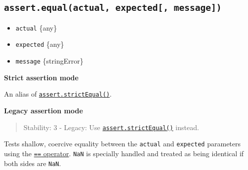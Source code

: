 \subsection{\texorpdfstring{\texttt{assert.equal(actual,\ expected{[},\ message{]})}}{assert.equal(actual, expected{[}, message{]})}}\label{assert.equalactual-expected-message}

\begin{itemize}
\tightlist
\item
  \texttt{actual} \{any\}
\item
  \texttt{expected} \{any\}
\item
  \texttt{message} \{string\textbar Error\}
\end{itemize}

\textbf{Strict assertion mode}

An alias of
\hyperref[assertstrictequalactual-expected-message]{\texttt{assert.strictEqual()}}.

\textbf{Legacy assertion mode}

\begin{quote}
Stability: 3 - Legacy: Use
\hyperref[assertstrictequalactual-expected-message]{\texttt{assert.strictEqual()}}
instead.
\end{quote}

Tests shallow, coercive equality between the \texttt{actual} and
\texttt{expected} parameters using the
\href{https://developer.mozilla.org/en-US/docs/Web/JavaScript/Reference/Operators/Equality}{\texttt{==}
operator}. \texttt{NaN} is specially handled and treated as being
identical if both sides are \texttt{NaN}.

\begin{Shaded}
\begin{Highlighting}[]
 \OperatorTok{;}

\NormalTok{(}\OperatorTok{,} \NormalTok{)}\OperatorTok{;}
\NormalTok{(}\OperatorTok{,} \StringTok{\textquotesingle{}1\textquotesingle{}}\NormalTok{)}\OperatorTok{;}
\NormalTok{(}\OperatorTok{,} \NormalTok{)}\OperatorTok{;}

\NormalTok{(}\OperatorTok{,} \NormalTok{)}\OperatorTok{;}
\NormalTok{(\{ }\OperatorTok{:}\NormalTok{ \{ }\OperatorTok{:} \NormalTok{ \} \}}\OperatorTok{,}\NormalTok{ \{ }\OperatorTok{:}\NormalTok{ \{ }\OperatorTok{:} \NormalTok{ \} \})}\OperatorTok{;}
\end{Highlighting}
\end{Shaded}

